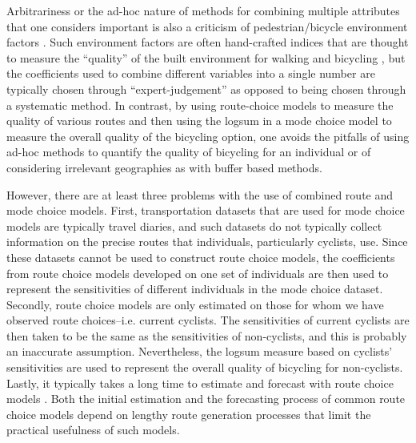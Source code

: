 \documentclass{article}
\begin{document}
Arbitrariness or the ad-hoc nature of methods for combining multiple attributes that one considers important is also a criticism of pedestrian/bicycle environment factors \citep{ewing_travel_2001}. Such environment factors are often hand-crafted indices that are thought to measure the ``quality'' of the built environment for walking and bicycling \citep{replogle_integrating_1995}, but the coefficients used to combine different variables into a single number are typically chosen through ``expert-judgement'' as opposed to being chosen through a systematic method. In contrast, by using route-choice models to measure the quality of various routes and then using the logsum in a mode choice model to measure the overall quality of the  bicycling option, one avoids the pitfalls of using ad-hoc methods to quantify the quality of bicycling for an individual or of considering irrelevant geographies as with buffer based methods. 

However, there are at least three problems with the use of combined route and mode choice models. First, transportation datasets that are used for mode choice models are typically travel diaries, and such datasets do not typically collect information on the precise routes that individuals, particularly cyclists, use. Since these datasets cannot be used to construct route choice models, the coefficients from route choice models developed on one set of individuals are then used to represent the sensitivities of different individuals in the mode choice dataset. Secondly, route choice models are only estimated on those for whom we have observed route choices--i.e. current cyclists. The sensitivities of current cyclists are then taken to be the same as the sensitivities of non-cyclists, and this is probably an inaccurate assumption. Nevertheless, the logsum measure based on cyclists' sensitivities are used to represent the overall quality of bicycling for non-cyclists. Lastly, it typically takes a long time to estimate and forecast with route choice models \citep{nassir_choice_2014}. Both the initial estimation and the forecasting process of common route choice models depend on lengthy route generation processes that limit the practical usefulness of such models.
\end{document}
